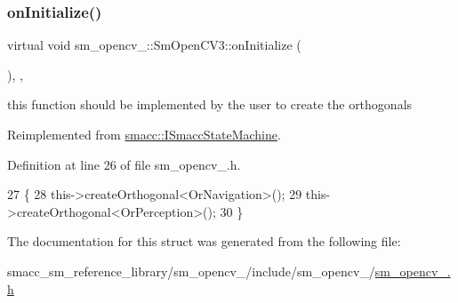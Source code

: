 \subsubsection{\texorpdfstring{on\+Initialize()}{onInitialize()}}
{\footnotesize\ttfamily virtual void sm\+\_\+opencv\+\_\+::\+Sm\+Open\+C\+V3\+::on\+Initialize (\begin{DoxyParamCaption}{ }\end{DoxyParamCaption})\hspace{0.3cm}{\ttfamily [inline]}, {\ttfamily [override]}, {\ttfamily [virtual]}}



this function should be implemented by the user to create the orthogonals 



Reimplemented from \hyperlink{classsmacc_1_1ISmaccStateMachine_ac2982c6c8283663e5e1e8a7c82f511ec}{smacc\+::\+I\+Smacc\+State\+Machine}.



Definition at line 26 of file sm\+\_\+opencv\+\_.\+h.


\begin{DoxyCode}
27     \{
28         this->createOrthogonal<OrNavigation>();
29         this->createOrthogonal<OrPerception>();
30     \}
\end{DoxyCode}


The documentation for this struct was generated from the following file\+:\begin{DoxyCompactItemize}
\item 
smacc\+\_\+sm\+\_\+reference\+\_\+library/sm\+\_\+opencv\+\_/include/sm\+\_\+opencv\+\_/\hyperlink{sm__opencv__3_8h}{sm\+\_\+opencv\+\_.\+h}\end{DoxyCompactItemize}
